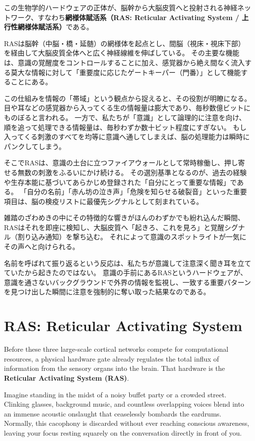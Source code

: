 この生物学的ハードウェアの正体が、脳幹から大脳皮質へと投射される神経ネットワーク、すなわち\textbf{網様体賦活系（RAS: Reticular Activating System / 上行性網様体賦活系）}である。

RASは脳幹（中脳・橋・延髄）の網様体を起点とし、間脳（視床・視床下部）を経由して大脳皮質全体へと広く神経線維を伸ばしている。
その主要な機能は、意識の覚醒度をコントロールすることに加え、感覚器から絶え間なく流入する莫大な情報に対して「重要度に応じたゲートキーパー（門番）」として機能することにある。

この仕組みを情報の「帯域」という観点から捉えると、その役割が明瞭になる。
目や耳などの感覚器から入ってくる生の情報量は膨大であり、毎秒数億ビットにものぼると言われる。
一方で、私たちが「意識」として論理的に注意を向け、順を追って処理できる情報量は、毎秒わずか数十ビット程度にすぎない。
もし入ってくる刺激のすべてを均等に意識へ通してしまえば、脳の処理能力は瞬時にパンクしてしまう。

そこでRASは、意識の土台に立つファイアウォールとして常時稼働し、押し寄せる無数の刺激をふるいにかけ続ける。
その選別基準となるのが、過去の経験や生存本能に基づいてあらかじめ登録された「自分にとって重要な情報」である。
「自分の名前」「赤ん坊の泣き声」「危険を知らせる破裂音」といった重要項目は、脳の検疫リストに最優先シグナルとして刻まれている。

雑踏のざわめきの中にその特徴的な響きがほんのわずかでも紛れ込んだ瞬間、RASはそれを即座に検知し、大脳皮質へ「起きろ、これを見ろ」と覚醒シグナル（割り込み通知）を撃ち込む。
それによって意識のスポットライトが一気にその声へと向けられる。

名前を呼ばれて振り返るという反応は、私たちが意識して注意深く聞き耳を立てていたから起きたのではない。
意識の手前にあるRASというハードウェアが、意識を通さないバックグラウンドで外界の情報を監視し、一致する重要パターンを見つけ出した瞬間に注意を強制的に奪い取った結果なのである。
\else
    \section{RAS: Reticular Activating System}

Before these three large-scale cortical networks compete for computational resources, a physical hardware gate already regulates the total influx of information from the sensory organs into the brain. That hardware is the \textbf{Reticular Activating System (RAS)}.

Imagine standing in the midst of a noisy buffet party or a crowded street.
Clinking glasses, background music, and countless overlapping voices blend into an immense acoustic onslaught that ceaselessly bombards the eardrums.
Normally, this cacophony is discarded without ever reaching conscious awareness, leaving your focus resting squarely on the conversation directly in front of you.

